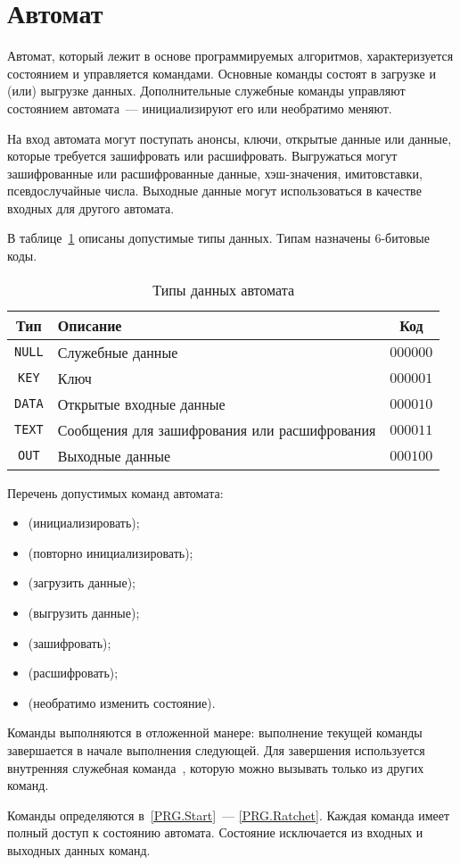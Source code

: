 \section{Автомат}\label{PRG.Auto}

Автомат, который лежит в основе программируемых алгоритмов, 
характеризуется состоянием и управляется командами.
%
Основные команды состоят в загрузке и (или) выгрузке данных.
Дополнительные служебные команды управляют состоянием автомата~---
инициализируют его или необратимо меняют.

На вход автомата могут поступать анонсы, ключи, 
открытые данные или данные, которые требуется зашифровать или расшифровать. 
%
Выгружаться могут зашифрованные или расшифрованные данные, хэш-значения, 
имитовставки, псевдослучайные числа. Выходные данные могут использоваться в 
качестве входных для другого автомата.

В таблице~\ref{Table.PRG.InOut} описаны допустимые типы данных. 
Типам назначены $6$-битовые коды.

\begin{table}[thb]
\caption{Типы данных автомата}\label{Table.PRG.InOut}
\begin{tabular}{|c|l|c|}
\hline
Тип & Описание & Код\\
\hline
\hline
\texttt{NULL} & Служебные данные & 
$000000$\\
%
\texttt{KEY} & Ключ & 
$000001$\\
%
\texttt{DATA} & Открытые входные данные & 
$000010$\\
%
\texttt{TEXT} & Сообщения для зашифрования или расшифрования & 
$000011$\\
%
\texttt{OUT} & Выходные данные & 
$000100$\\
\hline
\end{tabular}
\end{table}

Перечень допустимых команд автомата:
\begin{itemize}
\item
{} (инициализировать);
\item
{} (повторно инициализировать);
\item
{} (загрузить данные);
\item
{} (выгрузить данные);
\item
{} (зашифровать);
\item
{} (расшифровать);
\item
{} (необратимо изменить состояние).
\end{itemize}

Команды выполняются в отложенной манере: выполнение текущей 
команды завершается в начале выполнения следующей.
Для завершения используется внутренняя служебная команда~, 
которую можно вызывать только из других команд.

Команды определяются в~\ref{PRG.Start}~--- \ref{PRG.Ratchet}.
%
Каждая команда имеет полный доступ к состоянию автомата.
Состояние исключается из входных и выходных данных команд.

